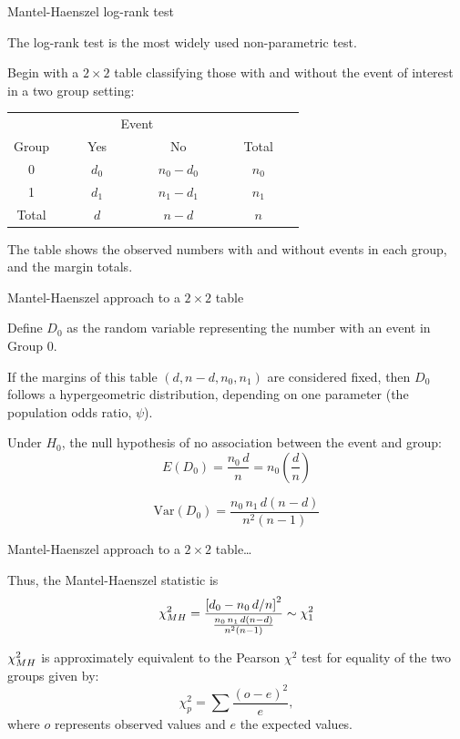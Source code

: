 \documentclass[ignorenonframetext,]{beamer}
\begin{document}
\begin{frame}{%
\protect\hypertarget{mantel-haenszel-log-rank-test}{%
Mantel-Haenszel log-rank test}}

The log-rank test is the most widely used non-parametric test.

Begin with a \(2 \times 2\) table classifying those with and without the
event of interest in a two group setting:

\begin{center}
\begin{tabular}{cccc}
\hline \hline
& \multicolumn{2}{c}{Event} & \\ \cline{2-3}
\multicolumn{1}{c}{Group } & ~~~~Yes~~~~ & ~~~~No~~~~ & ~~~Total~~~\\ \hline
0 & $d_0$ & $n_0 - d_0$ & $n_0$  \\
1 & $d_1$ & $n_1 - d_1$ & $n_1$ \\
\hline
Total &  $d  $ & $n   - d  $ & $n  $  \\ \hline \hline
\end{tabular}
\end{center}

The table shows the observed numbers with and without events in each
group, and the margin totals.

\end{frame}

\begin{frame}{%
\protect\hypertarget{mantel-haenszel-approach-to-a-2times2-table}{%
Mantel-Haenszel approach to a \(2\times2\) table}}

Define \(D_0\) as the random variable representing the number with an
event in Group 0.

If the margins of this table \((d, n-d, n_0, n_1)\) are considered
fixed, then \(D_0\) follows a hypergeometric distribution, depending on
one parameter (the population odds ratio, \(\psi\)).

Under \(H_0\), the null hypothesis of no association between the event
and group:
\[E(D_0) = \frac{n_0 \, d}{n} = n_0 \left(\frac{d}{n}\right) \]

\[\text{Var}(D_0) = \frac{n_0 \, n_1 \, d(n-d)}{n^2 (n-1)} \]

\end{frame}

\begin{frame}{%
\protect\hypertarget{mantel-haenszel-approach-to-a-2times2-table-1}{%
Mantel-Haenszel approach to a \(2\times2\) table\ldots}}

Thus, the Mantel-Haenszel statistic is
\[\chi^2_{\tiny MH } = \frac{\left[d_0-n_0 \, d/n\right]^2}{\frac{n_0
\, n_1 \, d(n-d)} {n^2 (n-1)}} \sim \chi^2_1
\]

\(\chi^2_{\tiny MH}\) is approximately equivalent to the Pearson
\(\chi^2\) test for equality of the two groups given by:
\[\chi^2_p = \sum \frac{(o-e)^2}{e}, \] where \(o\) represents observed
values and \(e\) the expected values.

\end{frame}
\end{document}
